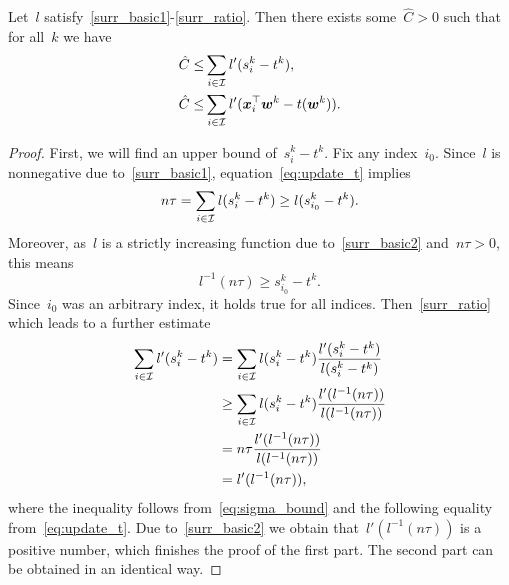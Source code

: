 \begin{lemma}\label{lemma:bound_zero}
  Let~$l$ satisfy~\ref{surr_basic1}-\ref{surr_ratio}. Then there exists some~$\hat{C} > 0$ such that for all~$k$ we have
  \begin{equation*}
    \begin{aligned}
      \hat{C} \le & \sum_{i \in \mathcal{I}} l'(s_i^k - t^k), \\
      \hat{C} \le & \sum_{i \in \mathcal{I}} l'(\bm{x}_i^\top \bm{w}^k - t(\bm{w}^k)).
    \end{aligned}
  \end{equation*}
\end{lemma}
\begin{proof}
  First, we will find an upper bound of~$s_i^k-t^k$. Fix any index~$i_0$. Since~$l$ is nonnegative due to~\ref{surr_basic1}, equation~\eqref{eq:update_t} implies
  \begin{equation*}
    n\tau = \sum_{i \in \mathcal{I}} l(s_i^k - t^k) \ge l(s_{i_0}^k - t^k).
  \end{equation*}
  Moreover, as~$l$ is a strictly increasing function due to~\ref{surr_basic2} and~$n\tau>0$, this means 
  \begin{equation}\label{eq:sigma_bound}
    l^{-1}(n\tau) \ge s_{i_0}^k-t^k.
  \end{equation}
  Since~$i_0$ was an arbitrary index, it holds true for all indices. Then~\ref{surr_ratio} which leads to a further estimate
  \begin{equation*}
    \begin{aligned}
    \sum_{i \in \mathcal{I}} l'(s_i^k - t^k)
      & = \sum_{i\in \mathcal{I}} l(s_i^k-t^k) \frac{l'(s_i^k-t^k)}{l(s_i^k-t^k)} \\
      & \ge \sum_{i \in \mathcal{I}} l(s_i^k - t^k) \frac{l'(l^{-1}(n\tau))}{l(l^{-1}(n\tau))} \\
      & = n\tau \frac{l'(l^{-1}(n\tau))}{l(l^{-1}(n\tau))} \\
      & = l'(l^{-1}(n\tau)),
    \end{aligned}
  \end{equation*}
  where the inequality follows from~\eqref{eq:sigma_bound} and the following equality from~\eqref{eq:update_t}. Due to~\ref{surr_basic2} we obtain that~$l'(l^{-1}(n\tau))$ is a positive number, which finishes the proof of the first part. The second part can be obtained in an identical way.
\end{proof}

\pagebreak

